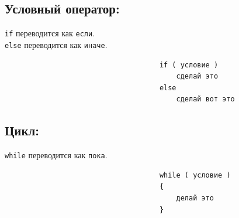 \documentclass{article}
\begin{document}
\subsection*{Условный оператор:}
\texttt{if} переводится как \texttt{если}. \\
\texttt{else} переводится как \texttt{иначе}.

\begin{center}
\begin{lstlisting}
                                     if ( условие )
                                         сделай это
                                     else
                                         сделай вот это
\end{lstlisting}
\end{center}


\subsection*{Цикл:}
\texttt{while} переводится как \texttt{пока}. \\

\begin{lstlisting}
                                     while ( условие )
                                     {
                                         делай это
                                     }
\end{lstlisting}
\end{document}
